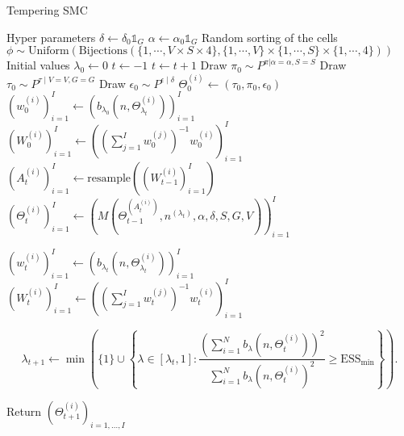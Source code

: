 \documentclass{article}
\begin{document}
\begin{algorithm}[H]
\caption{Tempering SMC}
\begin{algorithmic}

\State Hyper parameters
\Indent
\State $\delta\gets \delta_0 \mathds{1}_G$
\State $\alpha\gets \alpha_0\mathds{1}_G$ 
\EndIndent
\State Random sorting of the cells
\Indent 
\State $\phi\sim \mathrm{Uniform}\left(\mathrm{Bijections}(\{1,\cdots,V\times S\times 4\},\{1,\cdots,V\}\times\{1,\cdots,S\}\times\{1,\cdots,4\})\right)$
\EndIndent
\State Initial values
\Indent
\State $\lambda_{0}\gets 0$
\State $t\gets -1$
\EndIndent
\EndStep
{}
\State $t\gets t+1$
\State Draw $\pi_0\sim P^{\pi|\alpha=\alpha,S=S}$ 
\State Draw $\tau_0\sim P^{\tau\mid V=V,G=G}$
\State Draw $\epsilon_0\sim P^{\epsilon\mid \delta}$ 
\State $\Theta_0^{(i)}\gets(\tau_0,\pi_0,\epsilon_0)$
\State $\left(w_{0}^{(i)}\right)_{i=1}^I\gets\left(b_{\lambda_0}\left(n,\Theta_{\lambda_t}^{(i)}\right)\right)_{i=1}^I$
\State $\left(W_0^{(i)}\right)_{i=1}^I\gets\left(\left(\sum_{j=1}^I w_0^{(j)}\right)^{-1}{w_0^{(i)}}\right)_{i=1}^I$
\EndFor
\Else
        \State $\left(A_{t}^{(i)}\right)_{i=1}^I\gets \mathrm{resample}\left(\left(W_{t-1}^{(i)}\right)_{i=1}^I\right)$
         \State
         $\left(\Theta_{t}^{(i)}\right)_{i=1}^I\gets \left(M\left(\Theta_{t-1}^{(A_{t}^{(i)})},n^{(\lambda_t)},\alpha,\delta,S,G,V\right)\right)_{i=1}^I$
        
\EndIf

\State 
 
\State $\left(w_t^{(i)}\right)_{i=1}^I\gets\left(b_{\lambda_t}\left(n,\Theta_{\lambda_t}^{(i)}\right)\right)_{i=1}^I$
\State $\left(W_t^{(i)}\right)_{i=1}^I\gets\left(\left(\sum_{j=1}^I w_t^{(j)}\right)^{-1}{w_t^{(i)}}\right)_{i=1}^I$


\State 
$$\lambda_{t+1}\gets\min\left(\{1\}\cup \left\{\lambda\in [\lambda_t,1]:\frac{\left(\sum_{i=1}^N b_{\lambda}\left(n,\Theta_t^{(i)}\right)\right)^2}{\sum_{i=1}^N b_{\lambda}\left(n,\Theta_t^{(i)}\right)^2}
 \geq\mathrm{ESS}_{\mathrm{min}}\right\}\right).$$



\EndWhile
\EndStep
\State Return $\left(\Theta_{t+1}^{(i)}\right)_{i=1,\ldots,I}$
\EndProcedure
\end{algorithmic}
\end{algorithm}
\end{document}
